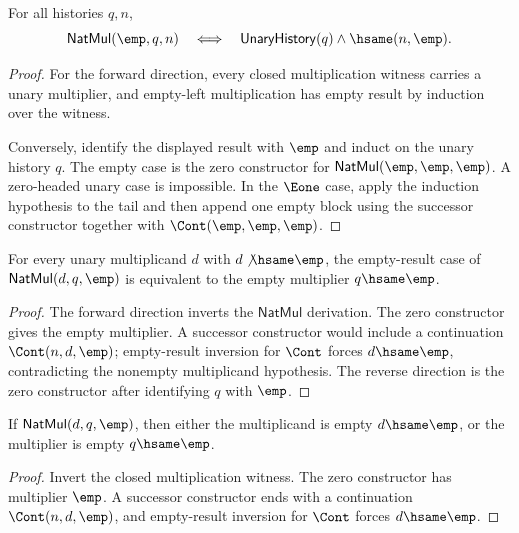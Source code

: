 \begin{theorem}
\label{thm:natmul-empty-left-iff}
For all histories $q,n$,
$$
\mathsf{NatMul}(\emp,q,n)
\quad\Longleftrightarrow\quad
\mathsf{UnaryHistory}(q)\land \hsame(n,\emp).
$$
\end{theorem}
\begin{proof}
For the forward direction, every closed multiplication witness carries a unary
multiplier, and empty-left multiplication has empty result by induction over
the witness.

Conversely, identify the displayed result with $\emp$ and induct on the unary
history $q$. The empty case is the zero constructor for
$\mathsf{NatMul}(\emp,\emp,\emp)$. A zero-headed unary case is impossible. In
the $\Eone$ case, apply the induction hypothesis to the tail and then append
one empty block using the successor constructor together with
$\Cont(\emp,\emp,\emp)$.
\end{proof}

\begin{theorem}
\label{thm:natmul-nonempty-multiplicand-empty-result-iff}
For every unary multiplicand $d$ with $d\not\hsame\emp$, the empty-result
case of $\mathsf{NatMul}(d,q,\emp)$ is equivalent to the empty multiplier
$q\hsame\emp$.
\end{theorem}
\begin{proof}
The forward direction inverts the $\mathsf{NatMul}$ derivation. The zero
constructor gives the empty multiplier. A successor constructor would include
a continuation $\Cont(n,d,\emp)$; empty-result inversion for $\Cont$ forces
$d\hsame\emp$, contradicting the nonempty multiplicand hypothesis. The reverse
direction is the zero constructor after identifying $q$ with $\emp$.
\end{proof}

\begin{lemma}
\label{lem:natmul-empty-result-factor-empty-or-multiplier-empty}
If \(\mathsf{NatMul}(d,q,\emp)\), then either the multiplicand is empty
\(d\hsame\emp\), or the multiplier is empty \(q\hsame\emp\).
\end{lemma}
\begin{proof}
Invert the closed multiplication witness. The zero constructor has multiplier
\(\emp\). A successor constructor ends with a continuation \(\Cont(n,d,\emp)\),
and empty-result inversion for \(\Cont\) forces \(d\hsame\emp\).
\end{proof}

